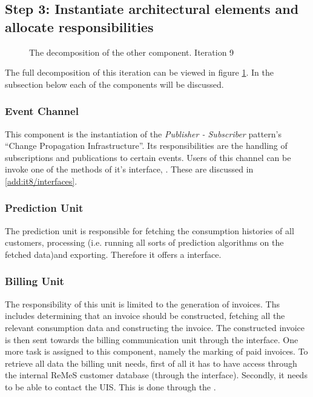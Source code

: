 \subsection{Step 3: Instantiate architectural elements and allocate responsibilities}
\label{add:it9/elements}

\begin{figure}[H]
	\begin{centering}
		\caption{The decomposition of the other component. Iteration
		9}
		\label{fig:add/it9/decomposition}
	\end{centering}
\end{figure}

\npar The full decomposition of this iteration can be viewed in figure
\ref{fig:add/it9/decomposition}. In the subsection below each of the components
will be discussed. 

\subsubsection{Event Channel}

\npar This component is the instantiation of the \emph{Publisher - Subscriber}
pattern's ``Change Propagation Infrastructure''. Its responsibilities are the
handling of subscriptions and publications to certain events. Users of this
channel can be invoke one of the methods of it's interface,
. These are discussed in \ref{add:it8/interfaces}.

\subsubsection{Prediction Unit}

\npar The prediction unit is responsible for fetching the consumption
histories of all customers, processing (i.e. running all sorts of
prediction algorithms on the fetched data)and exporting. Therefore it offers a
 interface.

\subsubsection{Billing Unit}

\npar The responsibility of this unit is limited to the generation of invoices.
Ths includes determining that an invoice should be constructed, fetching all the
relevant consumption data and constructing the invoice. The constructed invoice
is then sent towards the billing communication unit through the
 interface. One more task is assigned to this
component, namely the marking of paid invoices. To retrieve all data the
billing unit needs, first of all it has to have access through the internal
ReMeS customer database (through the  interface).
Secondly, it needs to be able to contact the UIS. This is done through the
.

